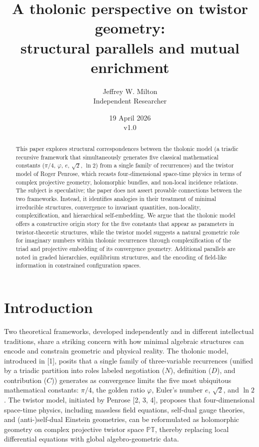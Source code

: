 \documentclass[12pt]{article}
\title{A tholonic perspective on twistor geometry:\\
\large structural parallels and mutual enrichment}
\author{Jeffrey W. Milton\\[4pt]{\small Independent Researcher}}
\date{\small 19 April 2026 \\ v1.0}
\begin{document}
\maketitle

\begin{abstract}
This paper explores structural correspondences between the tholonic
model (a triadic recursive framework that simultaneously generates five
classical mathematical constants (\(\pi/4\), \(\varphi\), \(e\),
\(\sqrt{2}\), \(\ln 2\)) from a single family of recurrences) and the
twistor model of Roger Penrose, which recasts four-dimensional
space-time physics in terms of complex projective geometry, holomorphic
bundles, and non-local incidence relations. The subject is speculative;
the paper does not assert provable connections between the two
frameworks. Instead, it identifies analogies in their treatment of
minimal irreducible structures, convergence to invariant quantities,
non-locality, complexification, and hierarchical self-embedding. We
argue that the tholonic model offers a constructive origin story for the
five constants that appear as parameters in twistor-theoretic
structures, while the twistor model suggests a natural geometric role
for imaginary numbers within tholonic recurrences through
complexification of the triad and projective embedding of its
convergence geometry. Additional parallels are noted in graded
hierarchies, equilibrium structures, and the encoding of field-like
information in constrained configuration spaces.
\end{abstract}

\section{Introduction}\label{introduction}

Two theoretical frameworks, developed independently and in different
intellectual traditions, share a striking concern with how minimal
algebraic structures can encode and constrain geometric and physical
reality. The tholonic model, introduced in {[}1{]}, posits that a single
family of three-variable recurrences (unified by a triadic partition
into roles labeled negotiation (\(N\)), definition (\(D\)), and
contribution (\(C\))) generates as convergence limits the five most
ubiquitous mathematical constants: \(\pi/4\), the golden ratio
\(\varphi\), Euler's number \(e\), \(\sqrt{2}\), and \(\ln 2\). The
twistor model, initiated by Penrose {[}2, 3, 4{]}, proposes that
four-dimensional space-time physics, including massless field equations,
self-dual gauge theories, and (anti-)self-dual Einstein geometries, can
be reformulated as holomorphic geometry on complex projective twistor
space \(\mathbb{PT}\), thereby replacing local differential equations
with global algebro-geometric data.
\end{document}
